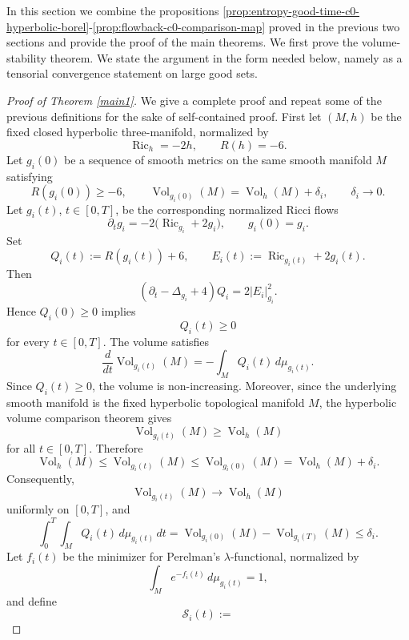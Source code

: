\documentclass{amsart}
\begin{document}
In this section we combine the propositions \ref{prop:entropy-good-time-c0-hyperbolic-borel}-\ref{prop:flowback-c0-comparison-map} proved in the previous two sections and provide the proof of the main theorems. We first prove the volume-stability theorem.  We state the argument in the
form needed below, namely as a tensorial convergence statement on large
good sets.  
\begin{proof}[Proof of Theorem \ref{main1}]
We give a complete proof and repeat some of the previous definitions for the sake of self-contained proof. First let
$(M,h)$
be the fixed closed hyperbolic three-manifold, normalized by
\[
        \operatorname{Ric}_{h}=-2h,
        \qquad
        R(h)=-6.
\]
Let \(g_i(0)\) be a sequence of smooth metrics on the same smooth manifold
\(M\) satisfying
\[
        R(g_i(0))\geq -6,
        \qquad
        \operatorname{Vol}_{g_i(0)}(M)
        =
        \operatorname{Vol}_{h}(M)+\delta_i,
        \qquad
        \delta_i\to0.
\]
Let \(g_i(t)\), \(t\in[0,T]\), be the corresponding normalized Ricci flows
\[
        \partial_t g_i
        =
        -2\bigl(\operatorname{Ric}_{g_i}+2g_i\bigr),
        \qquad
        g_i(0)=g_i.
\]
Set
\[
        Q_i(t):=R(g_i(t))+6,
        \qquad
        E_i(t):=\operatorname{Ric}_{g_i(t)}+2g_i(t).
\]
Then
\[
        (\partial_t-\Delta_{g_i}+4)Q_i
        =
        2|E_i|_{g_i}^{2}.
\]
Hence \(Q_i(0)\geq0\) implies
\[
        Q_i(t)\geq0
\]
for every \(t\in[0,T]\). The volume satisfies
\[
        \frac{d}{dt}\operatorname{Vol}_{g_i(t)}(M)
        =
        -\int_M Q_i(t)\,d\mu_{g_i(t)}.
\]
Since \(Q_i(t)\geq0\), the volume is non-increasing.  Moreover, since the
underlying smooth manifold is the fixed hyperbolic topological manifold
\(M\), the hyperbolic volume comparison theorem gives
\[
        \operatorname{Vol}_{g_i(t)}(M)
        \geq
        \operatorname{Vol}_{h}(M)
\]
for all \(t\in[0,T]\).  Therefore
\[
        \operatorname{Vol}_{h}(M)
        \leq
        \operatorname{Vol}_{g_i(t)}(M)
        \leq
        \operatorname{Vol}_{g_i(0)}(M)
        =
        \operatorname{Vol}_{h}(M)+\delta_i.
\]
Consequently,
\[
        \operatorname{Vol}_{g_i(t)}(M)\to\operatorname{Vol}_{h}(M)
\]
uniformly on \([0,T]\), and
\[
        \int_0^T\int_M Q_i(t)\,d\mu_{g_i(t)}\,dt
        =
        \operatorname{Vol}_{g_i(0)}(M)
        -
        \operatorname{Vol}_{g_i(T)}(M)
        \leq
        \delta_i.
\]
\noindent Let \(f_i(t)\) be the minimizer for Perelman's \(\lambda\)-functional,
normalized by
\[
        \int_M e^{-f_i(t)}\,d\mu_{g_i(t)}=1,
\]
and define
\[
        \mathcal S_i(t)
        :=
\]
\end{proof}
\end{document}
